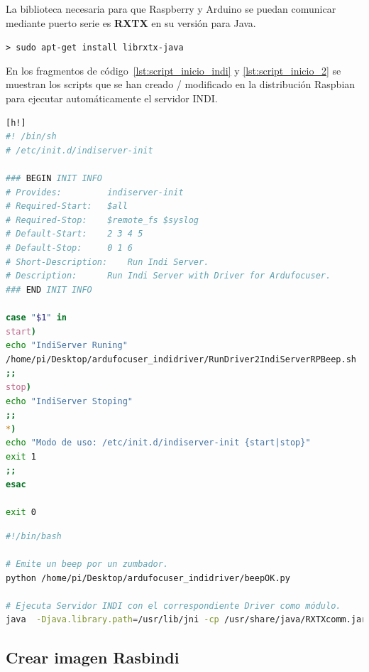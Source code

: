 La biblioteca necesaria para que Raspberry y Arduino se puedan comunicar mediante puerto serie es \textbf{RXTX} en su versión para Java. 

\begin{center}
\texttt{> sudo apt-get install librxtx-java}
\end{center}

En los fragmentos de código~\ref{lst:script_inicio_indi} y \ref{lst:script_inicio_2} se muestran los scripts que se han creado / modificado en la distribución Raspbian para ejecutar automáticamente el servidor INDI.

\begin{lstlisting}[language=bash, caption={Script de inicio del servidor INDI},label={lst:script_inicio_indi}][h!]
#! /bin/sh
# /etc/init.d/indiserver-init

### BEGIN INIT INFO
# Provides: 		indiserver-init
# Required-Start: 	$all
# Required-Stop:	$remote_fs $syslog
# Default-Start:	2 3 4 5
# Default-Stop:		0 1 6
# Short-Description:	Run Indi Server.
# Description:		Run Indi Server with Driver for Ardufocuser.
### END INIT INFO

case "$1" in
start)
echo "IndiServer Runing"
/home/pi/Desktop/ardufocuser_indidriver/RunDriver2IndiServerRPBeep.sh
;;
stop)
echo "IndiServer Stoping"
;;
*)
echo "Modo de uso: /etc/init.d/indiserver-init {start|stop}"
exit 1
;;
esac

exit 0
\end{lstlisting}


\begin{lstlisting}[language=bash, caption={Script de inicio del servidor INDI (2)},label={lst:script_inicio_2}]
#!/bin/bash

# Emite un beep por un zumbador.
python /home/pi/Desktop/ardufocuser_indidriver/beepOK.py

# Ejecuta Servidor INDI con el correspondiente Driver como módulo.
java  -Djava.library.path=/usr/lib/jni -cp /usr/share/java/RXTXcomm.jar  -jar /home/pi/Desktop/ardufocuser_indidriver/I4JServer/dist/I4JServer.jar -add=/home/pi/Desktop/ardufocuser_indidriver/I4JArdufocuserDriver/dist/I4JArdufocuserDriver.jar
\end{lstlisting}





\subsection{Crear imagen Rasbindi}

